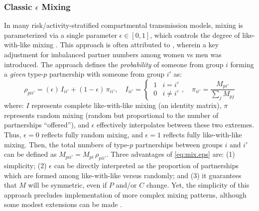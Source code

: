 \subsubsection{Classic $\epsilon$ Mixing}
In many risk/activity-stratified compartmental transmission models,
mixing is parameterized via a single parameter $\epsilon \in [0,1]$,
which controls the degree of like-with-like mixing \cite{Nold1980}.
This approach is often attributed to \cite{Garnett1994},
wherein a key adjustment for imbalanced partner numbers among women vs men was introduced.
The approach defines the \emph{probability} of
someone from group $i$ forming a \emph{given} type-$p$ partnership with someone from group $i'$ as:
\begin{equation}\label{eq:mix.eps}
  \rho_{pii'} = (\epsilon)\,I_{ii'} + (1 - \epsilon)\,\pi_{ii'},
  \quad I_{ii'} = \begin{cases} ~1 & i = i'\\ ~0 & i \ne i' \end{cases},
  \quad \pi_{ii'} = \frac{M_{pi'}}{\sum_{j}M_{pj}}
\end{equation}
where:
$I$ represents complete like-with-like mixing (an identity matrix),
$\pi$ represents random mixing (random but proportional to the number of partnerships ``offered''),
and $\epsilon$ effectively interpolates between these two extremes.
Thus, $\epsilon = 0$ reflects fully random mixing,
and $\epsilon = 1$ reflects fully like-with-like mixing.
Then, the total numbers of type-$p$ partnerships between groups $i$ and $i'$ can be
defined as $M_{pii'} = M_{pi}\,\rho_{pii'}$.
Three advantages of \eqref{eq:mix.eps} are:
(1) simplicity;
(2) $\epsilon$ can be directly interpreted as the proportion of partnerships
which are formed among like-with-like versus randomly; and
(3) it guarantees that $M$ will be symmetric, even if $P$ and/or $C$ change.
Yet, the simplicity of this approach precludes implementation of more complex mixing patterns,
although some modest extensions can be made \cite{TODO}.
